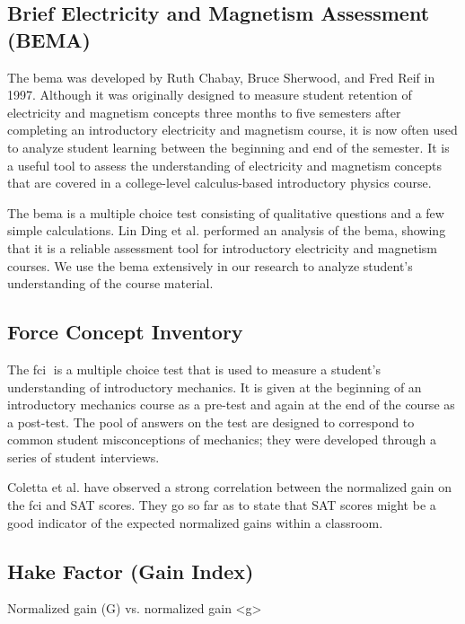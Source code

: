 \subsection{Brief Electricity and Magnetism Assessment (BEMA)}

The \gls{bema} was developed by Ruth Chabay, Bruce Sherwood, and Fred Reif in 1997. Although it was originally designed to measure student retention of electricity and magnetism concepts three months to five semesters after completing an introductory electricity and magnetism course, it is now often used to analyze student learning between the beginning and end of the semester. It is a useful tool to assess the understanding of electricity and magnetism concepts that are covered in a college-level calculus-based introductory physics course\cite{ding2006}.

The \gls{bema} is a multiple choice test consisting of qualitative questions and a few simple calculations. Lin Ding et al. performed an analysis of the \gls{bema}, showing that it is a reliable assessment tool for introductory electricity and magnetism courses\cite{ding2006}. We use the \gls{bema} extensively in our research to analyze student's understanding of the course material.

\subsection{Force Concept Inventory}

The \gls{fci}􏰁 is a multiple choice test that is used to measure a student's understanding of introductory mechanics. It is given at the beginning of an introductory mechanics course as a pre-test and again at the end of the course as a post-test. The pool of answers on the test are designed to correspond to common student misconceptions of mechanics; they were developed through a series of student interviews\cite{hestenes1992}.

Coletta et al. have observed a strong correlation between the normalized gain on the \gls{fci} and SAT scores. They go so far as to state that SAT scores might be a good indicator of the expected normalized gains within a classroom\cite{coletta2007}.

\subsection{Hake Factor (Gain Index)}

Normalized gain (G) vs. normalized gain <g>

